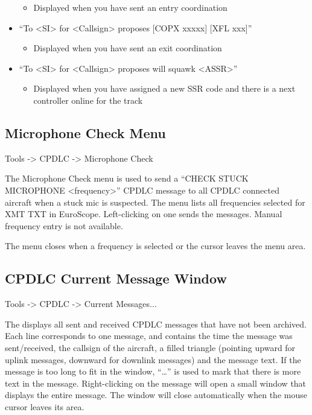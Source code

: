 \documentclass[a4paper,oneside,11pt]{memoir}
\begin{document}
\begin{itemize}
        \begin{itemize}
             \item Displayed when you have sent an entry coordination
        \end{itemize}
    \item“To <SI> for <Callsign> proposes [COPX xxxxx] [XFL xxx]”
        \begin{itemize}
             \item Displayed when you have sent an exit coordination
        \end{itemize}
    \item“To <SI> for <Callsign> proposes will squawk <ASSR>”
        \begin{itemize}
             \item Displayed when you have assigned a new SSR code and there is a next controller online for the track
        \end{itemize}
\end{itemize}
    
\subsection{Microphone Check Menu}
\label{menu:dlmcm}

 Tools -> CPDLC -> Microphone Check

\bigskip


The Microphone Check menu is used to send a “CHECK STUCK MICROPHONE <frequency>” CPDLC message to all CPDLC connected aircraft when a stuck mic is suspected. The menu lists all frequencies selected for XMT TXT in EuroScope. Left-clicking on one sends the messages. Manual frequency entry is not available.

\bigskip

The menu closes when a frequency is selected or the cursor leaves the menu area.

\subsection{CPDLC Current Message Window}
\label{win:dlcmw}

 Tools -> CPDLC -> Current Messages...

\bigskip


The  displays all sent and received CPDLC messages that have not been archived. Each line corresponds to one message, and contains the time the message was sent/received, the callsign of the aircraft, a filled triangle (pointing upward for uplink messages, downward for downlink messages) and the message text. If the message is too long to fit in the window, “…” is used to mark that there is more text in the message. Right-clicking on the message will open a small window that displays the entire message. The window will close automatically when the mouse cursor leaves its area.
\end{document}
